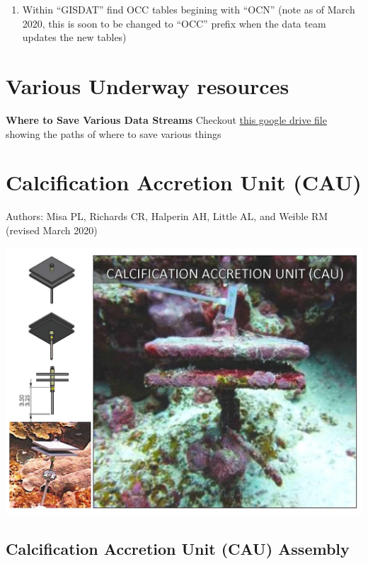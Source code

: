 \documentclass[]{book}
\begin{document}
\begin{enumerate}
\item
  Within ``GISDAT'' find OCC tables begining with ``OCN'' (note as of March 2020, this is soon to be changed to ``OCC'' prefix when the data team updates the new tables)
\end{enumerate}

\hypertarget{various-underway-resources}{%
\chapter{Various Underway resources}\label{various-underway-resources}}

\textbf{Where to Save Various Data Streams}
Checkout \href{https://docs.google.com/spreadsheets/d/16l1OQgGEunLoADh_MEGyIfbQL2w0u6aw/edit\#gid=1675337307}{this google drive file} showing the paths of where to save various things

\hypertarget{calcification-accretion-unit-cau}{%
\chapter{Calcification Accretion Unit (CAU)}\label{calcification-accretion-unit-cau}}

Authors: Misa PL, Richards CR, Halperin AH, Little AL, and Weible RM (revised March 2020)

\includegraphics{images/CAU.jpg}

\hypertarget{calcification-accretion-unit-cau-assembly}{%
\section{Calcification Accretion Unit (CAU) Assembly}\label{calcification-accretion-unit-cau-assembly}}
\end{document}
